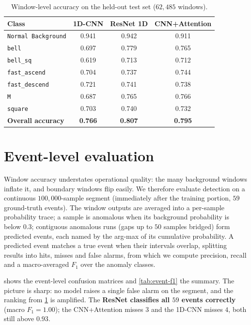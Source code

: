 \begin{table}[H]
    \centering \footnotesize
    \begin{tabular}{lccc}
        \toprule
        Class & \textbf{1D-CNN} & \textbf{ResNet 1D} & \textbf{CNN+Attention} \\
        \midrule
        \texttt{Normal Background} & 0.941 & 0.942 & 0.911 \\
        \texttt{bell}              & 0.697 & 0.779 & 0.765 \\
        \texttt{bell\_sq}          & 0.619 & 0.713 & 0.712 \\
        \texttt{fast\_ascend}      & 0.704 & 0.737 & 0.744 \\
        \texttt{fast\_descend}     & 0.721 & 0.741 & 0.738 \\
        \texttt{M}                 & 0.687 & 0.765 & 0.766 \\
        \texttt{square}            & 0.703 & 0.740 & 0.732 \\
        \midrule
        \textbf{Overall accuracy}  & \textbf{0.766} & \textbf{0.807} & \textbf{0.795} \\
        \bottomrule
    \end{tabular}
    \caption{Window-level accuracy on the held-out test set ($62{,}485$ windows).}
    \label{tab:window-acc}
\end{table}

\section{Event-level evaluation}
\label{sec:event-eval}

Window accuracy understates operational quality: the many background windows
inflate it, and boundary windows flip easily. We therefore evaluate detection on
a continuous $100{,}000$-sample segment (immediately after the training portion,
$59$ ground-truth events). The window outputs are averaged into a per-sample
probability trace; a sample is anomalous when its background probability is
below $0.3$; contiguous anomalous runs (gaps up to $50$ samples bridged) form
predicted events, each named by the arg-max of its cumulative probability. A
predicted event matches a true event when their intervals overlap, splitting
results into hits, misses and false alarms, from which we compute precision,
recall and a macro-averaged $F_1$ over the anomaly classes.

 shows the event-level confusion matrices and
\cref{tab:event-f1} the summary. The picture is sharp: no model raises a single
false alarm on the segment, and the ranking from \cref{tab:window-acc} is
amplified. The \textbf{ResNet classifies all $59$ events correctly} (macro $F_1
= 1.00$); the CNN+Attention misses $3$ and the 1D-CNN misses $4$, both still
above $0.93$.

